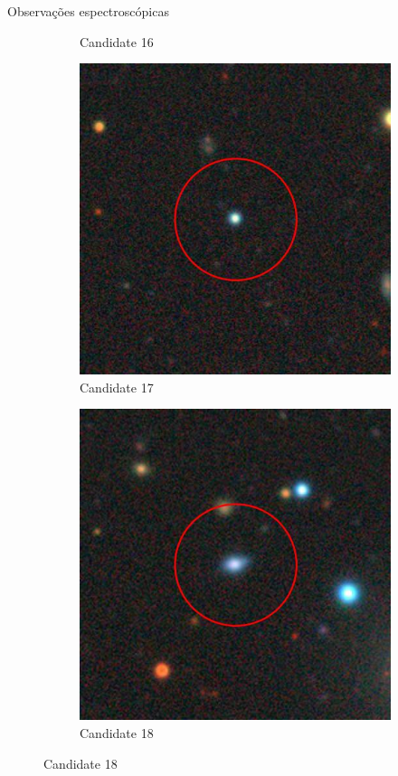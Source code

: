 \begin{frame}[c]{Observações espectroscópicas}
\begin{figure}
\begin{subfigure}[b]{0.11\textwidth}
        \caption{Candidate 16}
    \end{subfigure}
    \begin{subfigure}[b]{0.11\textwidth}
        \includegraphics[width=\textwidth]{images/proposatal_candidatas_1/UCG17.jpg}
        \caption{Candidate 17}
    \end{subfigure}
    \begin{subfigure}[b]{0.11\textwidth}
        \includegraphics[width=\textwidth]{images/proposatal_candidatas_1/UCG18.jpg}
        \caption{Candidate 18}
    \end{subfigure}
\end{figure}
\end{frame}

